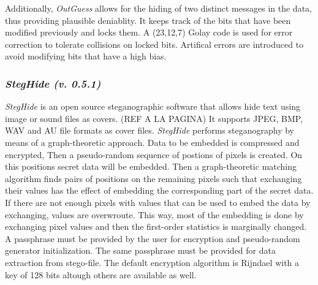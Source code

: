 \documentclass[11pt]{article}
\begin{document}
Additionally,  \textit{OutGuess}  allows  for the hiding of two distinct messages in the data, thus providing plausible 
deniablity.  It keeps track  of  the  bits  that  have  been  modified previously  and  locks  them.   A  (23,12,7)  Golay  code  
is used for error correction to tolerate collisions on locked bits.  Artifical errors are introduced  to  avoid  modifying bits 
that have a high bias.

\subsubsection{\textit{}}

\subsubsection{\textit{StegHide (v. 0.5.1)}}
\textit{StegHide} is an open source steganographic software that allows hide text using image or sound files as covers. (REF A LA PAGINA)
It supports JPEG, BMP, WAV and AU file formats as cover files. 
\textit{StegHide} performs steganography by means of a graph-theoretic approach. Data to be embedded is compressed and encrypted,
Then a pseudo-random sequence of postions of pixels is created. On this positions secret data will be embedded. Then a
graph-theoretic  matching  algorithm finds pairs of positions on the remaining pixels such that exchanging their values has
the effect of embedding the corresponding  part of the secret data. If there are not enough pixels with values that can be used
to embed the data by exchanging, values are overwroute. This way, most of the embedding  is  done  by  exchanging  pixel  values
and then the first-order statistics is marginally changed. A passphrase must be provided by the user for encryption and
pseudo-random generator initialization. The same passphrase must be provided for data extraction from stego-file. The default
encryption algorithm is Rijndael with a key of 128 bits altough others are available as well.
\end{document}
